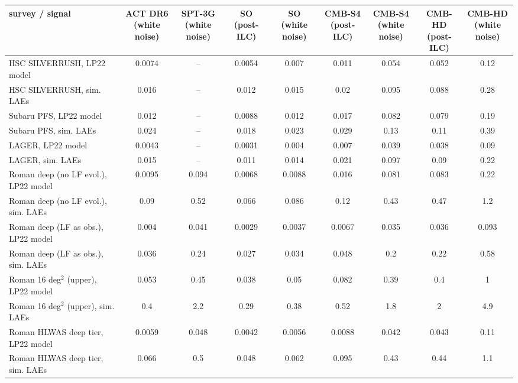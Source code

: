 \begin{tabular}{lcccccccc}
\toprule
survey / signal & \shortstack{ACT DR6\\(white noise)} & \shortstack{SPT-3G\\(white noise)} & \shortstack{SO\\(post-ILC)} & \shortstack{SO\\(white noise)} & \shortstack{CMB-S4\\(post-ILC)} & \shortstack{CMB-S4\\(white noise)} & \shortstack{CMB-HD\\(post-ILC)} & \shortstack{CMB-HD\\(white noise)} \\
\midrule
HSC SILVERRUSH, LP22 model & 0.0074 & -- & 0.0054 & 0.007 & 0.011 & 0.054 & 0.052 & 0.12 \\
HSC SILVERRUSH, sim. LAEs & 0.016 & -- & 0.012 & 0.015 & 0.02 & 0.095 & 0.088 & 0.28 \\
Subaru PFS, LP22 model & 0.012 & -- & 0.0088 & 0.012 & 0.017 & 0.082 & 0.079 & 0.19 \\
Subaru PFS, sim. LAEs & 0.024 & -- & 0.018 & 0.023 & 0.029 & 0.13 & 0.11 & 0.39 \\
LAGER, LP22 model & 0.0043 & -- & 0.0031 & 0.004 & 0.007 & 0.039 & 0.038 & 0.09 \\
LAGER, sim. LAEs & 0.015 & -- & 0.011 & 0.014 & 0.021 & 0.097 & 0.09 & 0.22 \\
Roman deep (no LF evol.), LP22 model & 0.0095 & 0.094 & 0.0068 & 0.0088 & 0.016 & 0.081 & 0.083 & 0.22 \\
Roman deep (no LF evol.), sim. LAEs & 0.09 & 0.52 & 0.066 & 0.086 & 0.12 & 0.43 & 0.47 & 1.2 \\
Roman deep (LF as obs.), LP22 model & 0.004 & 0.041 & 0.0029 & 0.0037 & 0.0067 & 0.035 & 0.036 & 0.093 \\
Roman deep (LF as obs.), sim. LAEs & 0.036 & 0.24 & 0.027 & 0.034 & 0.048 & 0.2 & 0.22 & 0.58 \\
Roman 16 deg$^2$ (upper), LP22 model & 0.053 & 0.45 & 0.038 & 0.05 & 0.082 & 0.39 & 0.4 & 1 \\
Roman 16 deg$^2$ (upper), sim. LAEs & 0.4 & 2.2 & 0.29 & 0.38 & 0.52 & 1.8 & 2 & 4.9 \\
Roman HLWAS deep tier, LP22 model & 0.0059 & 0.048 & 0.0042 & 0.0056 & 0.0088 & 0.042 & 0.043 & 0.11 \\
Roman HLWAS deep tier, sim. LAEs & 0.066 & 0.5 & 0.048 & 0.062 & 0.095 & 0.43 & 0.44 & 1.1 \\
\bottomrule
\end{tabular}
